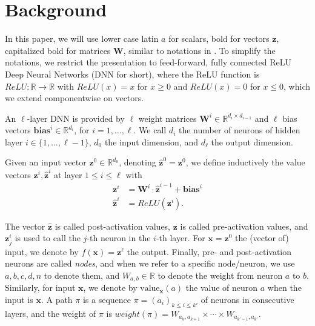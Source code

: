 \documentclass{llncs}
\newcommand{\vz}{\boldsymbol{z}}
\newcommand{\vb}{\boldsymbol{bias}}
\newcommand{\val}{{\textrm{value}}}
\begin{document}
	
	
	
	\section{Background}
	
	In this paper, we will use lower case latin $a$ for scalars, bold for vectors $\boldsymbol{z}$, 
	capitalized bold for matrices $\boldsymbol{W}$, similar to notations in \cite{prima,crown}.
	To simplify the notations, we restrict the presentation to feed-forward, 
	fully connected ReLU Deep Neural Networks (DNN for short), where the ReLU function is $ReLU : \mathbb{R} \rightarrow \mathbb{R}$ with
	$ReLU(x)=x$ for $x \geq 0$ and $ReLU(x)=0$ for $x \leq 0$, which we extend componentwise on vectors.
	
	
	
	
	An $\ell$-layer DNN is provided by $\ell$ weight matrices 
	$\boldsymbol{W}^i \in \mathbb{R}^{d_i\times d_{i-1}}$
	and $\ell$ bias vectors $\vb^i \in \mathbb{R}^{d_i}$, for $i=1, \ldots, \ell$.
	We call $d_i$ the number of neurons of hidden layer $i \in \{1, \ldots, \ell-1\}$,
	$d_0$ the input dimension, and $d_\ell$ the output dimension.
	
	Given an input vector $\boldsymbol{z}^0 \in \mathbb{R}^{d_0}$, 
	denoting $\hat{\boldsymbol{z}}^{0}={\boldsymbol{z}}^0$, we define inductively the value vectors $\boldsymbol{z}^i,\hat{\vz}^i$ at layer $1 \leq i \leq \ell$ with
	\begin{align*}
		{\boldsymbol{z}}^{i} &= \boldsymbol{W}^i\cdot \hat{\boldsymbol{z}}^{i-1}+ \vb^i\\
		\hat{\boldsymbol{z}}^{i} &= ReLU({\boldsymbol{z}}^i).
	\end{align*} 
	
	The vector $\hat{\boldsymbol{z}}$ is called post-activation values, 
	$\boldsymbol{z}$ is called pre-activation values, 
	and $\boldsymbol{z}^{i}_j$ is used to call the $j$-th neuron in the $i$-th layer. 
	For $\boldsymbol{x}=\vz^0$ the (vector of) input, we denote by $f(\boldsymbol{x})=\vz^\ell$ the output. Finally, pre- and post-activation neurons are called \emph{nodes}, and when we refer to a specific node/neuron, we use $a,b,c,d,n$ to denote them, and $W_{a,b} \in \mathbb{R}$ to denote the weight from neuron $a$ to $b$. Similarly, for input $\boldsymbol{x}$, we denote by $\val_{\boldsymbol{x}}(a)$ the value of neuron $a$ when the input is $\boldsymbol{x}$. A path $\pi$ is a sequence $\pi=(a_i)_{k \leq  i \leq k'}$ of neurons in consecutive layers, and the weight of $\pi$ is 
	$weight(\pi)=W_{a_k,a_{k+1}} \times \cdots \times  W_{a_{k'-1},a_{k'}}$.
	
\end{document}
